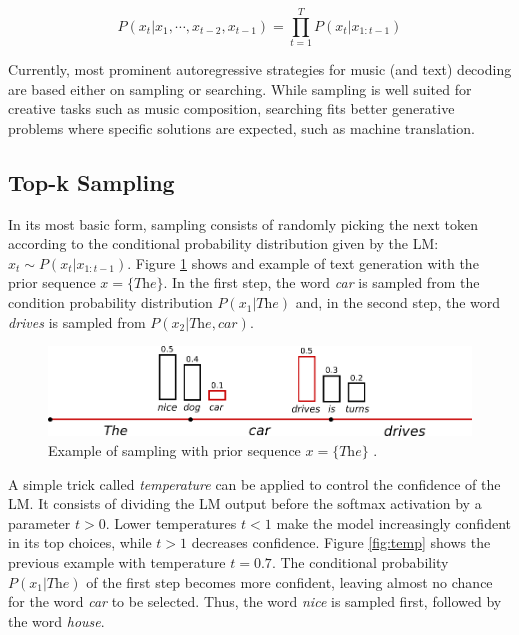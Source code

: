 \begin{equation} \label{eq:autoregressive}
    P(x_t|x_1, \cdots, x_{t-2}, x_{t-1}) = \prod_{t=1}^{T} P(x_t|x_{1:t-1})
\end{equation}

Currently, most prominent autoregressive strategies for music (and text) decoding are based either on sampling or searching. While sampling is well suited for creative tasks such as music composition, searching fits better generative problems where specific solutions are expected, such as machine translation.

\subsection{Top-k Sampling}

In its most basic form, sampling consists of randomly picking the next token according to the conditional probability distribution given by the LM: $x_t \sim P(x_t|x_{1:t-1})$. Figure \ref{fig:topk} shows and example of text generation with the prior sequence $x = \{\textit{The}\}$. In the first step, the word \textit{car} is sampled from the condition probability distribution $P(x_1 | \textit{The})$ and, in the second step, the word \textit{drives} is sampled from $P(x_2 | \textit{The}, \textit{car})$.

\begin{figure}[!h]
 \centering
 \includegraphics[width=0.9\columnwidth]{imgs/background/sampling.png}
 \caption{Example of sampling with prior sequence $x = \{\textit{The}\}$ \cite{platen2020}.}
 \label{fig:topk}
\end{figure}

A simple trick called \textit{temperature} can be applied to control the confidence of the LM. It consists of dividing the LM output before the softmax activation by a parameter $t > 0$. Lower temperatures $t < 1$ make the model increasingly confident in its top choices, while $t > 1$ decreases confidence. Figure \ref{fig:temp} shows the previous example with temperature $t = 0.7$. The conditional probability $P(x_1 | \textit{The})$ of the first step becomes more confident, leaving almost no chance for the word \textit{car} to be selected. Thus, the word \textit{nice} is sampled first, followed by the word \textit{house}.

